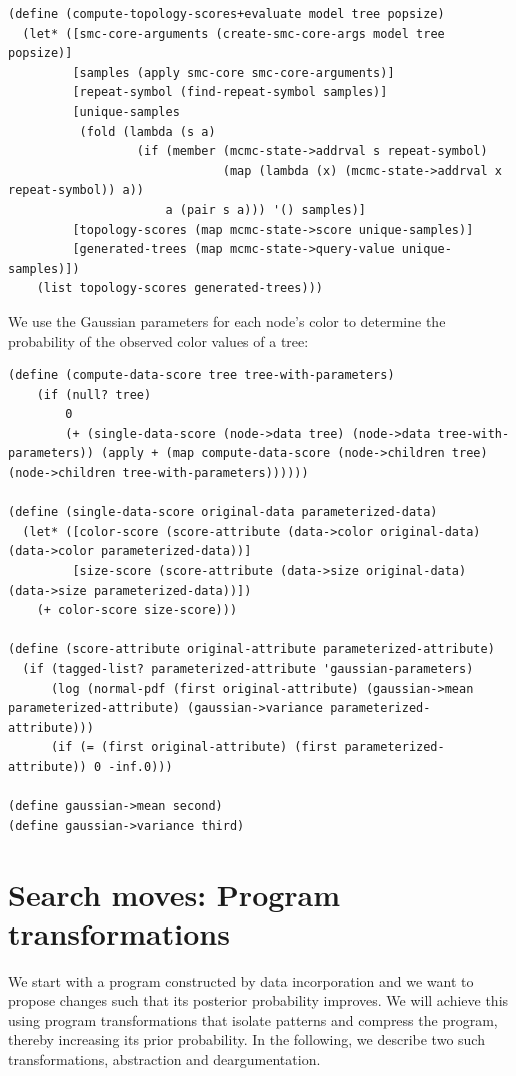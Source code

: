 \documentclass[a4paper,10pt]{article}
\begin{document}
\begin{lstlisting}[frame=trbl]
(define (compute-topology-scores+evaluate model tree popsize)
  (let* ([smc-core-arguments (create-smc-core-args model tree popsize)]
         [samples (apply smc-core smc-core-arguments)]
         [repeat-symbol (find-repeat-symbol samples)]
         [unique-samples
          (fold (lambda (s a)
                  (if (member (mcmc-state->addrval s repeat-symbol)
                              (map (lambda (x) (mcmc-state->addrval x repeat-symbol)) a))
                      a (pair s a))) '() samples)]
         [topology-scores (map mcmc-state->score unique-samples)]
         [generated-trees (map mcmc-state->query-value unique-samples)])
    (list topology-scores generated-trees)))
\end{lstlisting}
We use the Gaussian parameters for each node's color to determine the probability of the observed color values of a tree:
\begin{lstlisting}[frame=trbl]
(define (compute-data-score tree tree-with-parameters)
    (if (null? tree)
        0
        (+ (single-data-score (node->data tree) (node->data tree-with-parameters)) (apply + (map compute-data-score (node->children tree) (node->children tree-with-parameters))))))

(define (single-data-score original-data parameterized-data)
  (let* ([color-score (score-attribute (data->color original-data) (data->color parameterized-data))]
         [size-score (score-attribute (data->size original-data) (data->size parameterized-data))])
    (+ color-score size-score)))

(define (score-attribute original-attribute parameterized-attribute)
  (if (tagged-list? parameterized-attribute 'gaussian-parameters)
      (log (normal-pdf (first original-attribute) (gaussian->mean parameterized-attribute) (gaussian->variance parameterized-attribute)))
      (if (= (first original-attribute) (first parameterized-attribute)) 0 -inf.0)))

(define gaussian->mean second)
(define gaussian->variance third)
\end{lstlisting}


\newpage
\section{Search moves: Program transformations}

We start with a program constructed by data incorporation and we want to propose changes such that its posterior probability improves. We will achieve this  using program transformations that isolate patterns and compress the program, thereby increasing its prior probability. In the following, we describe two such transformations, abstraction and deargumentation.
\end{document}
